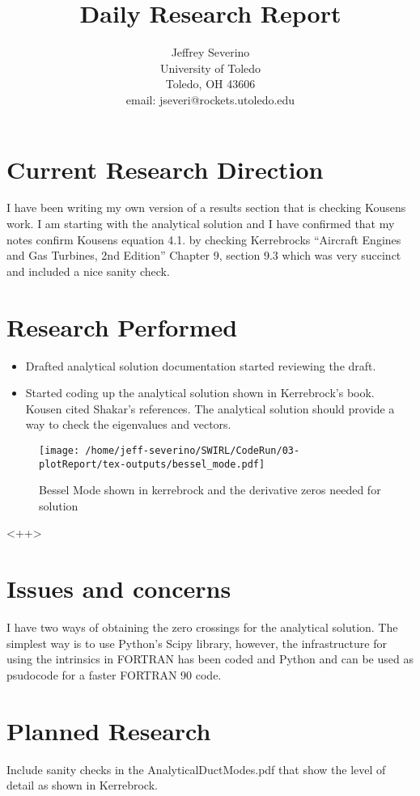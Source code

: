 \documentclass[a4paper]{article}
\begin{document}
\begin{titlepage}

    \title{
    Daily Research Report}

    \author{ Jeffrey Severino \\
        University of Toledo \\
        Toledo, OH  43606 \\
    email: jseveri@rockets.utoledo.edu}


    \maketitle

\end{titlepage}
\section{Current Research Direction}
I have been writing my own version of a results section that is checking Kousens
work. I am starting with the analytical solution and I have confirmed that my 
notes confirm Kousens equation 4.1. by checking Kerrebrocks ``Aircraft Engines 
and Gas Turbines, 2nd Edition'' Chapter 9, section 9.3 which was very succinct 
and included a nice sanity check. 
\section{Research Performed}
\begin{itemize}
    \item Drafted analytical solution documentation started reviewing the draft.
    \item Started coding up the analytical solution shown in Kerrebrock's book. 
        Kousen cited Shakar's references. The analytical solution should 
        provide a way to check the eigenvalues and vectors.
\end{itemize}
\begin{figure}[h!]
    \centering
     \texttt{[image: /home/jeff-severino/SWIRL/CodeRun/03-plotReport/tex-outputs/bessel\_mode.pdf]}
    \caption{Bessel Mode shown in kerrebrock and the derivative zeros needed for solution }
\end{figure}<++>
\section{Issues and concerns}
I have two ways of obtaining the zero crossings for the analytical solution. The
simplest way is to use Python's Scipy library, however, the infrastructure for
using the intrinsics in FORTRAN has been coded and Python and can be used as 
psudocode for a faster FORTRAN 90 code.
\section{Planned Research}
Include sanity checks in the AnalyticalDuctModes.pdf that show the level of detail as 
shown in Kerrebrock.
\end{document}
